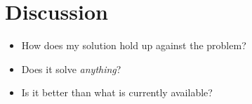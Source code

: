 \chapter{Discussion}
\begin{itemize}
    \item How does my solution hold up against the problem?
    \item Does it solve \textit{anything}?
    \item Is it better than what is currently available?
\end{itemize}